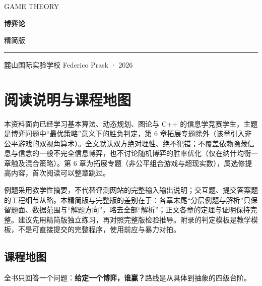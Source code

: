 \documentclass[UTF8,a4paper,11pt,oneside,openany,fontset=fandol]{ctexbook}
\theoremstyle{definition}
\begin{document}
\frontmatter
\begin{titlepage}
\setlength{\parindent}{0pt}
\vspace*{1.2cm}
{\large\color{accent}GAME THEORY}\par
\vspace{1cm}
{\fontsize{46}{56}\selectfont\bfseries\color{ink}博弈论}\par
\vspace{0.5cm}
{\Large 精简版}\par
\vspace{0.5cm}
{\color{accent}\rule{\textwidth}{1.2pt}}\par
\vspace{0.3cm}
\begin{minipage}{0.9\textwidth}
\large 麓山国际实验学校 Federico Prask · 2026
\end{minipage}\par
\vfill
{\normalsize }\par
{\small}
\end{titlepage}
\chapter*{阅读说明与课程地图}

\begin{pitfall}[适用范围与阅读边界]
本资料面向已经学习基本算法、动态规划、图论与 C++ 的信息学竞赛学生，主题是博弈问题中“最优策略”意义下的胜负判定，第 6 章拓展专题除外（该章引入非公平游戏的双视角算术）。全文默认双方绝对理性、绝不犯错；不覆盖依赖隐藏信息与信念的一般不完全信息博弈，也不讨论随机博弈的胜率优化（仅在纳什均衡一章触及混合策略）。第 6 章为拓展专题（非公平组合游戏与超现实数），属选修提高内容，首次阅读可以整章跳过。

例题采用教学性摘要，不代替评测网站的完整输入输出说明；交互题、提交答案题的工程细节从略。本精简版与完整版的差别在于：各章末尾“分层例题与解析”只保留题面、数据范围与“解题方向”，略去全部“解析”；正文各章的定理与证明保持完整。建议先用精简版独立练习，再对照完整版检验推导。附录的判定模板是教学模板，不是可直接提交的完整程序，使用前应与暴力对拍。
\end{pitfall}

\section*{课程地图}
全书只回答一个问题：\textbf{给定一个博弈，谁赢？}路线是从具体到抽象的四级台阶。
\end{document}
